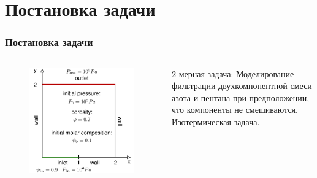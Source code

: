 \section{Постановка задачи}

\begin{frame}
    \frametitle{Постановка задачи}

    \begin{columns}

    \begin{column}{0.7\textwidth}
        \begin{figure}[H]
            \centering
            \includegraphics[height=0.8\textheight]
            {img/problem.pdf}
        \end{figure}
    \end{column}

    \begin{column}{0.4\textwidth}
        2-мерная задача:
        Моделирование фильтрации двухкомпонентной смеси 
        азота и пентана при предположении, что компоненты
        не смешиваются.
        Изотермическая задача.
    \end{column}

    \end{columns}

\end{frame}
